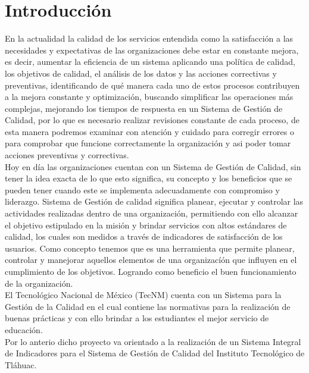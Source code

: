 \chapter{Introducci\'on}
	En la actualidad la calidad de los servicios entendida como la satisfacci\'on a las necesidades 
	y expectativas de las organizaciones debe estar en constante mejora, es decir, aumentar la eficiencia 
	de un sistema aplicando una pol\'itica de calidad, los objetivos de calidad, el an\'alisis de los datos y 
	las acciones correctivas y preventivas, identificando de qu\'e manera cada uno de estos procesos
	contribuyen a la mejora constante y optimizaci\'on, buscando simplificar las operaciones m\'as complejas, 
	mejorando los tiempos de respuesta en un Sistema de Gesti\'on de Calidad, por lo que es necesario realizar 
	revisiones constante de cada proceso, de esta manera podremos examinar con atenci\'on y cuidado para corregir 
	errores o para comprobar que funcione correctamente la organizaci\'on y asi poder tomar acciones preventivas y correctivas.\\

	Hoy en d\'ia las organizaciones cuentan con un Sistema de Gesti\'on de Calidad, sin tener la idea exacta de lo que esto significa, su concepto y los beneficios que se pueden tener cuando este se implementa adecuadamente con compromiso y liderazgo. Sistema de Gesti\'on de calidad significa planear, ejecutar y controlar las actividades realizadas dentro de una organizaci\'on, permitiendo con ello alcanzar el objetivo estipulado en la misi\'on y brindar servicios con altos est\'andares de calidad, los cuales son medidos a trav\'es de indicadores de satisfacci\'on de los usuarios. Como concepto tenemos que es una herramienta que permite planear, controlar y manejorar aquellos elementos de una organizac\'i\'on que influyen en el cumplimiento de los objetivos. Logrando como beneficio el buen funcionamiento de la organizaci\'on.\\

	El Tecnol\'ogico Nacional de M\'exico (TecNM) cuenta con un Sistema para  la Gesti\'on de la Calidad en el cual contiene las normativas para la realizaci\'on de buenas pr\'acticas y con ello brindar a los estudiantes el mejor servicio de educaci\'on.\\

	Por lo anterio dicho proyecto va orientado a la realizaci\'on de un Sistema Integral de Indicadores para el Sistema de Gesti\'on de Calidad del Instituto Tecnol\'ogico de Tl\'ahuac.\\

